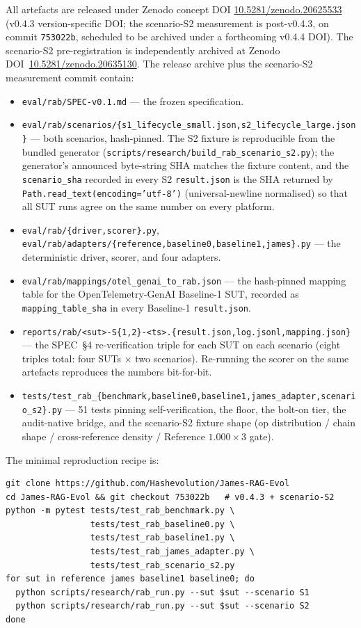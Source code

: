 \documentclass[11pt,a4paper]{article}
\begin{document}
All artefacts are released under Zenodo concept DOI \href{https://doi.org/10.5281/zenodo.20625533}{10.5281/zenodo.20625533} (v0.4.3 version-specific DOI; the scenario-S2 measurement is post-v0.4.3, on commit \texttt{753022b}, scheduled to be archived under a forthcoming v0.4.4 DOI). The scenario-S2 pre-registration is independently archived at Zenodo DOI~\href{https://doi.org/10.5281/zenodo.20635130}{10.5281/zenodo.20635130}. The release archive plus the scenario-S2 measurement commit contain:
\begin{itemize}[leftmargin=*]
  \item \texttt{eval/rab/SPEC-v0.1.md} --- the frozen specification.
  \item \texttt{eval/rab/scenarios/\{s1\_lifecycle\_small.json,s2\_lifecycle\_large.json\}} --- both scenarios, hash-pinned. The S2 fixture is reproducible from the bundled generator (\texttt{scripts/research/build\_rab\_scenario\_s2.py}); the generator's announced byte-string SHA matches the fixture content, and the \texttt{scenario\_sha} recorded in every S2 \texttt{result.json} is the SHA returned by \texttt{Path.read\_text(encoding='utf-8')} (universal-newline normalised) so that all SUT runs agree on the same number on every platform.
  \item \texttt{eval/rab/\{driver,scorer\}.py}, \texttt{eval/rab/adapters/\{reference,baseline0,baseline1,james\}.py} --- the deterministic driver, scorer, and four adapters.
  \item \texttt{eval/rab/mappings/otel\_genai\_to\_rab.json} --- the hash-pinned mapping table for the OpenTelemetry-GenAI Baseline-1 SUT, recorded as \texttt{mapping\_table\_sha} in every Baseline-1 \texttt{result.json}.
  \item \texttt{reports/rab/<sut>-S\{1,2\}-<ts>.\{result.json,log.jsonl,mapping.json\}} --- the SPEC~§4 re-verification triple for each SUT on each scenario (eight triples total: four SUTs $\times$ two scenarios). Re-running the scorer on the same artefacts reproduces the numbers bit-for-bit.
  \item \texttt{tests/test\_rab\_\{benchmark,baseline0,baseline1,james\_adapter,scenario\_s2\}.py} --- 51 tests pinning self-verification, the floor, the bolt-on tier, the audit-native bridge, and the scenario-S2 fixture shape (op distribution / chain shape / cross-reference density / Reference $1.000\times3$ gate).
\end{itemize}
The minimal reproduction recipe is:
\begin{lstlisting}
git clone https://github.com/Hashevolution/James-RAG-Evol
cd James-RAG-Evol && git checkout 753022b   # v0.4.3 + scenario-S2
python -m pytest tests/test_rab_benchmark.py \
                 tests/test_rab_baseline0.py \
                 tests/test_rab_baseline1.py \
                 tests/test_rab_james_adapter.py \
                 tests/test_rab_scenario_s2.py
for sut in reference james baseline1 baseline0; do
  python scripts/research/rab_run.py --sut $sut --scenario S1
  python scripts/research/rab_run.py --sut $sut --scenario S2
done
\end{lstlisting}
\end{document}
